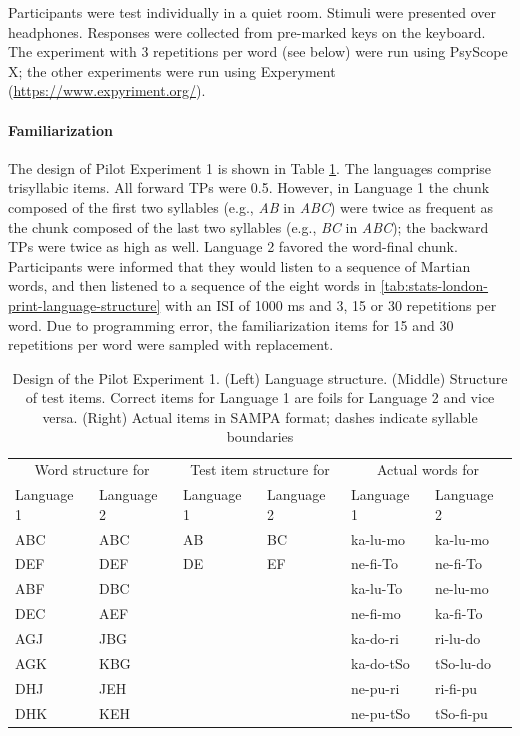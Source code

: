 \documentclass[
]{article}
\begin{document}
Participants were test individually in a quiet room. Stimuli were
presented over headphones. Responses were collected from pre-marked keys
on the keyboard. The experiment with 3 repetitions per word (see below)
were run using PsyScope X; the other experiments were run using
Experyment (\url{https://www.expyriment.org/}).

\paragraph{Familiarization}\label{familiarization-1}

The design of Pilot Experiment 1 is shown in Table
\ref{tab:bcn-print-language-structure}. The languages comprise
trisyllabic items. All forward TPs were 0.5. However, in Language 1 the
chunk composed of the first two syllables (e.g., \emph{AB} in
\emph{ABC}) were twice as frequent as the chunk composed of the last two
syllables (e.g., \emph{BC} in \emph{ABC}); the backward TPs were twice
as high as well. Language 2 favored the word-final chunk. Participants
were informed that they would listen to a sequence of Martian words, and
then listened to a sequence of the eight words in
\ref{tab:stats-london-print-language-structure} with an ISI of 1000 ms
and 3, 15 or 30 repetitions per word. Due to programming error, the
familiarization items for 15 and 30 repetitions per word were sampled
with replacement.

\begin{longtable}[t]{llllll}
\caption{\label{tab:bcn-print-language-structure}Design of the Pilot Experiment 1. (Left) Language structure. (Middle) Structure of test items. Correct items for Language 1 are foils for Language 2 and vice versa. (Right) Actual items in SAMPA format; dashes indicate syllable boundaries}\\
\toprule
\multicolumn{2}{c}{Word structure for} & \multicolumn{2}{c}{Test item structure for} & \multicolumn{2}{c}{Actual words for} \\
Language 1 & Language 2 & Language 1 & Language 2 & Language 1 & Language 2\\
\midrule
ABC & ABC & AB & BC & ka-lu-mo & ka-lu-mo\\
DEF & DEF & DE & EF & ne-fi-To & ne-fi-To\\
ABF & DBC &  &  & ka-lu-To & ne-lu-mo\\
DEC & AEF &  &  & ne-fi-mo & ka-fi-To\\
AGJ & JBG &  &  & ka-do-ri & ri-lu-do\\
\addlinespace
AGK & KBG &  &  & ka-do-tSo & tSo-lu-do\\
DHJ & JEH &  &  & ne-pu-ri & ri-fi-pu\\
DHK & KEH &  &  & ne-pu-tSo & tSo-fi-pu\\
\bottomrule
\end{longtable}
\end{document}
